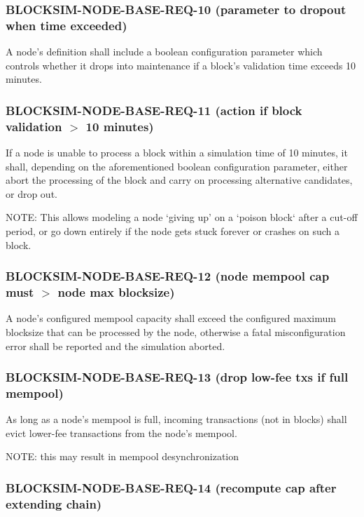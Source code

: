 \documentclass{scrreprt}
\begin{document}
      \subsubsection{BLOCKSIM-NODE-BASE-REQ-10 (parameter to dropout when time exceeded)}

        A node's definition shall include a boolean configuration parameter
        which controls whether it drops into maintenance if a block's
        validation time exceeds 10 minutes.

      \subsubsection{BLOCKSIM-NODE-BASE-REQ-11 (action if block validation $>$ 10 minutes)}

        If a node is unable to process a block within a simulation time of 10
        minutes, it shall, depending on the aforementioned  boolean configuration
        parameter, either abort the processing of the block and carry on processing
        alternative candidates, or drop out.

        NOTE: This allows modeling a node `giving up' on a `poison block` after
        a cut-off period, or go down entirely if the node gets stuck forever or
        crashes on such a block.

      \subsubsection{BLOCKSIM-NODE-BASE-REQ-12 (node mempool cap must $>$ node max blocksize)}

        A node's configured mempool capacity shall exceed the configured
        maximum blocksize that can be processed by the node, otherwise a fatal
        misconfiguration error shall be reported and the simulation aborted.

      \subsubsection{BLOCKSIM-NODE-BASE-REQ-13 (drop low-fee txs if full mempool)}

        As long as a node's mempool is full, incoming transactions (not in
        blocks) shall evict lower-fee transactions from the node's mempool.

        NOTE: this may result in mempool desynchronization

      \subsubsection{BLOCKSIM-NODE-BASE-REQ-14 (recompute cap after extending chain)}
\end{document}

